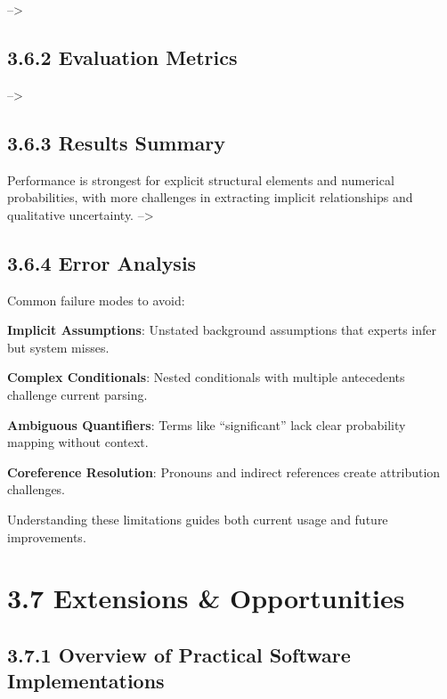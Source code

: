 \documentclass[
  11pt,
  letterpaper,
]{book}
\begin{document}
--\textgreater{}

\subsection*{3.6.2 Evaluation Metrics}\label{sec-evaluation-metrics}

--\textgreater{}

\subsection*{3.6.3 Results Summary}\label{sec-validation-results}

Performance is strongest for explicit structural elements and numerical
probabilities, with more challenges in extracting implicit relationships
and qualitative uncertainty. --\textgreater{}

\subsection*{3.6.4 Error Analysis}\label{sec-error-analysis}

Common failure modes to avoid:

\textbf{Implicit Assumptions}: Unstated background assumptions that
experts infer but system misses.

\textbf{Complex Conditionals}: Nested conditionals with multiple
antecedents challenge current parsing.

\textbf{Ambiguous Quantifiers}: Terms like ``significant'' lack clear
probability mapping without context.

\textbf{Coreference Resolution}: Pronouns and indirect references create
attribution challenges.

Understanding these limitations guides both current usage and future
improvements.

\section*{3.7 Extensions \&
Opportunities}\label{extensions-opportunities}


\subsection*{3.7.1 Overview of Practical Software
Implementations}\label{overview-of-practical-software-implementations}
\end{document}
